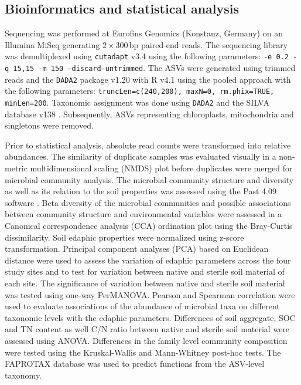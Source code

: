 \subsection{Bioinformatics and statistical analysis}

Sequencing was performed at Eurofins Genomics (Konstanz, Germany) on an Illumina MiSeq generating \(2\times 300\)\,bp paired-end reads. The sequencing library was demultiplexed using \texttt{cutadapt} v3.4 \citep{Martin2011} using the following parameters: \texttt{-e 0.2 -q 15,15 -m 150 --discard-untrimmed}. The ASVs were generated using trimmed reads and the \texttt{DADA2} package v1.20 \citep{Callahan2016} with R v4.1 using the pooled approach with the following parameters: \texttt{truncLen=c(240,200), maxN=0, rm.phix=TRUE, minLen=200}. Taxonomic assignment was done using \texttt{DADA2} and the SILVA database v138 \citep{Quast2012}. 
Subsequently, ASVs representing chloroplasts, mitochondria and singletons were removed.

Prior to statistical analysis, absolute read counts were transformed into relative abundances. The similarity of duplicate samples was evaluated visually in a non-metric multidimensional scaling (NMDS) plot before duplicates were merged for microbial community analysis. The microbial community structure and diversity as well as its relation to the soil properties was assessed using the Past 4.09 software \citep{Hammer2001}. Beta diversity of the microbial communities and possible associations between community structure and environmental variables were assessed in a Canonical correspondence analysis (CCA) ordination plot using the Bray-Curtis dissimilarity. Soil edaphic properties were normalized using z-score transformation. Principal component analyses (PCA) based on Euclidean distance were used to assess the variation of edaphic parameters across the four study sites and to test for variation between native and sterile soil material of each site. The significance of variation between native and sterile soil material was tested using one-way PerMANOVA. Pearson and Spearman correlation were used to evaluate associations of the abundance of microbial taxa on different taxonomic levels with the edaphic parameters. Differences of soil aggregate, SOC and TN content as well C/N ratio between native and sterile soil material were assessed using ANOVA. Differences in the family level community composition were tested using the Kruskal-Wallis and Mann-Whitney post-hoc tests. 
The FAPROTAX database \citep{Louca2016} was used to predict functions from the ASV-level taxonomy.

